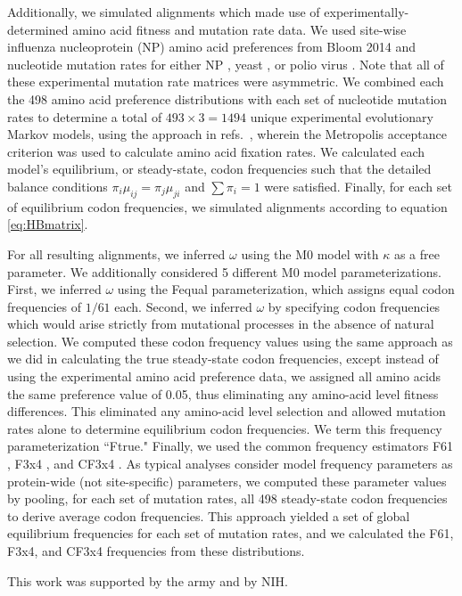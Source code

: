 \documentclass{pnastwo}
\begin{document}
\begin{article}
		
		Additionally, we simulated alignments which made use of experimentally-determined amino acid fitness and mutation rate data. We used site-wise influenza nucleoprotein (NP) amino acid preferences from Bloom 2014 \cite{Bloom2014a} and nucleotide mutation rates for either NP \cite{Bloom2014a}, yeast \cite{Zhu2014}, or polio virus \cite{Acevedo2014}. Note that all of these experimental mutation rate matrices were asymmetric. We combined each the 498 amino acid preference distributions with each set of nucleotide mutation rates to determine a total of $493 \times 3 = 1494$ unique experimental evolutionary Markov models, using the approach in refs.\ \cite{Bloom2014a,Bloom2014b}, wherein the Metropolis acceptance criterion \cite{Metropolis1953} was used to calculate amino acid fixation rates. We calculated each model's equilibrium, or steady-state, codon frequencies such that the detailed balance conditions $\pi_i\mu_{ij} = \pi_j\mu_{ji}$ and $\sum\pi_i = 1$ were satisfied. Finally, for each set of equilibrium codon frequencies, we simulated alignments according to equation \eqref{eq:HBmatrix}.
		
		For all resulting alignments, we inferred $\omega$ using the M0 model with $\kappa$ as a free parameter. We additionally considered 5 different M0 model parameterizations. First, we inferred $\omega$ using the Fequal \cite{Yang2006} parameterization, which assigns equal codon frequencies of $1/61$ each. Second, we inferred $\omega$ by specifying codon frequencies which would arise strictly from mutational processes in the absence of natural selection. We computed these codon frequency values using the same approach as we did in calculating the true steady-state codon frequencies, except instead of using the experimental amino acid preference data, we assigned all amino acids the same preference value of 0.05, thus eliminating any amino-acid level fitness differences. This eliminated any amino-acid level selection and allowed mutation rates alone to determine equilibrium codon frequencies. We term this frequency parameterization ``Ftrue." Finally, we used the common frequency estimators F61 \cite{GoldmanYang1994}, F3x4 \cite{MuseGaut1994}, and CF3x4 \cite{Pond2010}. As typical analyses consider model frequency parameters as protein-wide (not site-specific) parameters, we computed these parameter values by pooling, for each set of mutation rates, all 498 steady-state codon frequencies to derive average codon frequencies. This approach yielded a set of global equilibrium frequencies for each set of mutation rates, and we calculated the F61, F3x4, and CF3x4 frequencies from these distributions.
		
		
		\begin{acknowledgments}
			This work was supported by the army and by NIH.
		\end{acknowledgments}
		
		
		
		
		
		
		
	\end{article}
	
\end{document}
